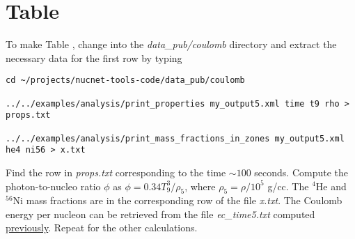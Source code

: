 \section*{Table }
\hypertarget{sec:table}{}


\noindent To make Table ,
change into the {\em data\_pub/coulomb} directory and extract the
necessary data for the first row by typing
\begin{verbatim}
cd ~/projects/nucnet-tools-code/data_pub/coulomb

../../examples/analysis/print_properties my_output5.xml time t9 rho > props.txt

../../examples/analysis/print_mass_fractions_in_zones my_output5.xml he4 ni56 > x.txt
\end{verbatim}
Find the row in {\em props.txt} corresponding to the time $\sim 100$ seconds.
Compute the photon-to-nucleo ratio $\phi$ as $\phi = 0.34 T_9^3 / \rho_5$,
where $\rho_5 = \rho / 10^5$ g/cc.   The $^4$He and $^{56}$Ni mass fractions
are in the corresponding row of the file {\em x.txt}.  The Coulomb energy
per nucleon can be retrieved from the file {\em ec\_time5.txt} computed
\hyperlink{sec:ec_time5}{previously}.  Repeat for the other calculations.

\addtocounter{table_counter}{1}
